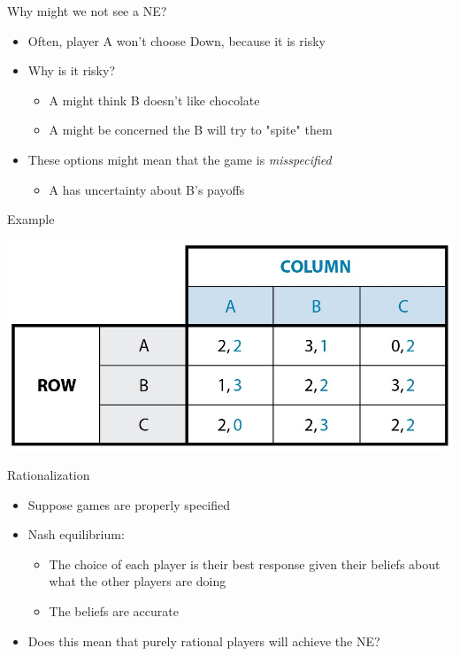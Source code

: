 \documentclass[10pt]{beamer}
\begin{document}
\begin{frame}[label={sec:org73f2a65}]{}
\alert{Why might we not see a NE?}
\begin{itemize}
\item Often, player A won't choose Down, because it is risky
\item Why is it risky?
\begin{itemize}
\item A might think B doesn't like chocolate
\item A might be concerned the B will try to "spite" them
\end{itemize}
\item These options might mean that the game is \emph{misspecified}
\begin{itemize}
\item A has uncertainty about B's payoffs
\end{itemize}
\end{itemize}
\end{frame}

\begin{frame}[label={sec:orge8b05d8}]{Example}
\begin{center}
\includegraphics[width=.75\textwidth]{./img/GAMES4_FIG05.03.jpg}
\end{center}
\end{frame}

\begin{frame}[label={sec:orgbf74e97}]{}
\alert{Rationalization}
\begin{itemize}
\item Suppose games are properly specified
\item Nash equilibrium:
\begin{itemize}
\item The choice of each player is their best response given their beliefs about what the other players are doing
\item The beliefs are accurate
\end{itemize}
\item Does this mean that purely rational players will achieve the NE?
\end{itemize}
\end{frame}
\end{document}
